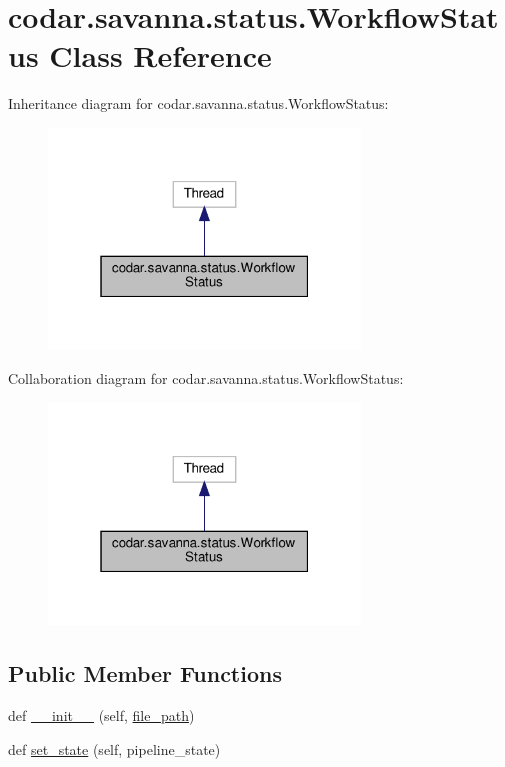 \hypertarget{classcodar_1_1savanna_1_1status_1_1_workflow_status}{}\section{codar.\+savanna.\+status.\+Workflow\+Status Class Reference}
\label{classcodar_1_1savanna_1_1status_1_1_workflow_status}


Inheritance diagram for codar.\+savanna.\+status.\+Workflow\+Status\+:
\nopagebreak
\begin{figure}[H]
\begin{center}
\leavevmode
\includegraphics[width=235pt]{classcodar_1_1savanna_1_1status_1_1_workflow_status__inherit__graph}
\end{center}
\end{figure}


Collaboration diagram for codar.\+savanna.\+status.\+Workflow\+Status\+:
\nopagebreak
\begin{figure}[H]
\begin{center}
\leavevmode
\includegraphics[width=235pt]{classcodar_1_1savanna_1_1status_1_1_workflow_status__coll__graph}
\end{center}
\end{figure}
\subsection*{Public Member Functions}
\begin{DoxyCompactItemize}
\item 
def \hyperlink{classcodar_1_1savanna_1_1status_1_1_workflow_status_a8e9bfa3627135919e28b501dde60241c}{\+\_\+\+\_\+init\+\_\+\+\_\+} (self, \hyperlink{classcodar_1_1savanna_1_1status_1_1_workflow_status_ae4eb41515ae3ac77a11e1905835497e6}{file\+\_\+path})
\item 
def \hyperlink{classcodar_1_1savanna_1_1status_1_1_workflow_status_a66a2494ce4cb8605df72cf480e756e08}{set\+\_\+state} (self, pipeline\+\_\+state)
\end{DoxyCompactItemize}
